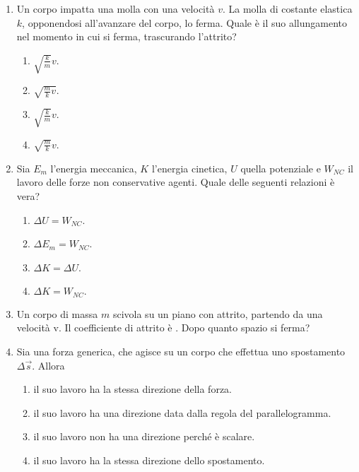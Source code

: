 \documentclass{article}
\begin{document}
\begin{enumerate}
  \item Un corpo impatta una molla con una velocità $v$. La molla di costante elastica $k$, opponendosi all'avanzare del corpo, lo ferma. Quale è il suo allungamento nel momento in cui si ferma, trascurando l'attrito?
  \begin{enumerate}[label=\Alph*.]
    \item $\sqrt{\frac{k}{m}}v$.
    \item $\sqrt{\frac{m}{k}v}$.
    \item $\sqrt{\frac{k}{m}}v$.
    \item $\sqrt{\frac{m}{k}}v$.
  \end{enumerate}
  \item Sia $E_m$ l'energia meccanica, $K$ l'energia cinetica, $U$ quella potenziale e $W_{NC}$ il lavoro delle forze non conservative agenti. Quale delle seguenti relazioni è vera?
  \begin{enumerate}[label=\Alph*.]
    \item $\Delta U=W_{NC}$.
    \item $\Delta E_m=W_{NC}$.
    \item $\Delta K = \Delta U$.
    \item $\Delta K=W_{NC}.$
  \end{enumerate}
  \item Un corpo di massa $m$ scivola su un piano con attrito, partendo da una velocità v. Il coefficiente di attrito è \mu. Dopo quanto spazio si ferma?
  \begin{enumerate}[label=\Alph*.]
    \item $\frac{1}{2}v^2+\mu g$.
    \item $\frac{2v^2}{g\mu}}$.
    \item $\frac{v^2}{2g\mu}}$.
    \item $\frac{1}{2}v^2-\mu g$.
  \end{enumerate}
  \item Sia  una forza generica, che agisce su un corpo che effettua uno spostamento $\Delta \vec{s}$. Allora
  \begin{enumerate}[label=\Alph*.]
    \item il suo lavoro ha la stessa direzione della forza.
    \item il suo lavoro ha una direzione data dalla regola del parallelogramma.
    \item il suo lavoro non ha una direzione perché è scalare.
    \item il suo lavoro ha la stessa direzione dello spostamento.

\end{enumerate}
\end{enumerate}
\end{document}

